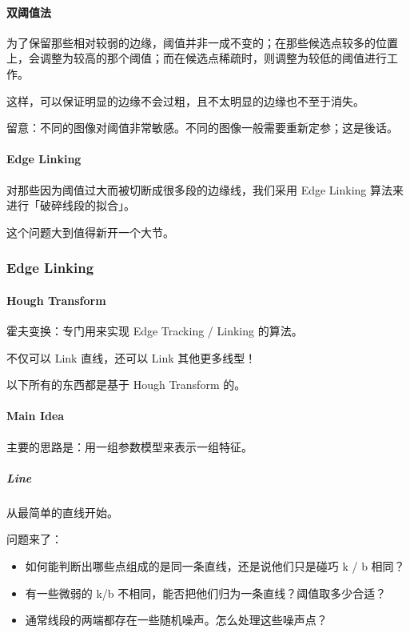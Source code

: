 \documentclass[
]{article}
\begin{document}
\hypertarget{header-n142}{%
\paragraph{双阈值法}\label{header-n142}}

为了保留那些相对较弱的边缘，阈值并非一成不变的；在那些候选点较多的位置上，会调整为较高的那个阈值；而在候选点稀疏时，则调整为较低的阈值进行工作。

这样，可以保证明显的边缘不会过粗，且不太明显的边缘也不至于消失。

留意：不同的图像对阈值非常敏感。不同的图像一般需要重新定参；这是後话。

\hypertarget{header-n146}{%
\paragraph{Edge Linking}\label{header-n146}}

对那些因为阈值过大而被切断成很多段的边缘线，我们采用 Edge Linking
算法来进行「破碎线段的拟合」。

这个问题大到值得新开一个大节。

\hypertarget{header-n149}{%
\subsubsection{Edge Linking}\label{header-n149}}

\hypertarget{header-n150}{%
\paragraph{Hough Transform}\label{header-n150}}

霍夫变换：专门用来实现 Edge Tracking / Linking 的算法。

不仅可以 Link 直线，还可以 Link 其他更多线型！

以下所有的东西都是基于 Hough Transform 的。

\hypertarget{header-n154}{%
\paragraph{Main Idea}\label{header-n154}}

主要的思路是：用一组参数模型来表示一组特征。

\hypertarget{header-n156}{%
\subparagraph{Line}\label{header-n156}}

从最简单的直线开始。

问题来了：

\begin{itemize}
\item
  如何能判断出哪些点组成的是同一条直线，还是说他们只是碰巧 k / b 相同？
\item
  有一些微弱的 k/b 不相同，能否把他们归为一条直线？阈值取多少合适？
\item
  通常线段的两端都存在一些随机噪声。怎么处理这些噪声点？
\end{itemize}
\end{document}
